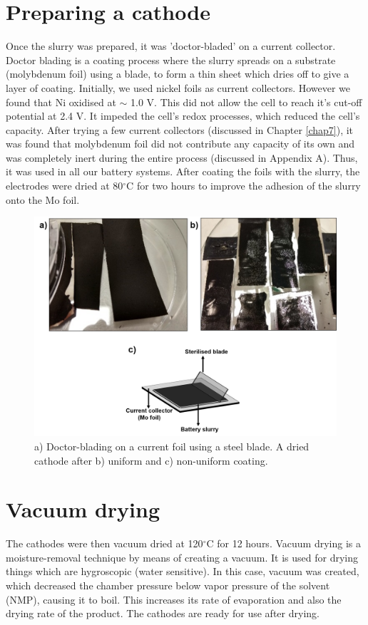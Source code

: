 \section{Preparing a cathode}
Once the slurry was prepared, it was 'doctor-bladed' on a current collector. Doctor blading is a coating process where the slurry spreads on a substrate (molybdenum foil)  using a blade, to form a thin sheet which dries off to give a layer of coating.  Initially, we used nickel foils as current collectors. However we found that Ni oxidised at $\sim$ 1.0 V. This did not allow the cell to reach it's cut-off potential at 2.4 V. It impeded the cell's redox processes, which reduced the cell's capacity. After trying a few current collectors (discussed in Chapter \ref{chap7}), it was found that molybdenum foil did not contribute any capacity of its own and was completely inert during the entire process (discussed in Appendix A). Thus, it was used in all our battery systems. After coating the foils with the slurry, the electrodes were dried at 80$^{\circ}$C for two hours to improve the adhesion of the slurry onto the Mo foil. 

\begin{figure}[tbh!]
\centering
\includegraphics[width=\textwidth]{Figures/chap3fig/coating}
\caption{a) Doctor-blading on a current foil using a steel blade. A dried cathode after b) uniform and c) non-uniform coating.}
\label{Figures/chap3fig:coating}
\end{figure}

\section{Vacuum drying}
The cathodes were then vacuum dried at 120$^{\circ}$C for 12 hours. Vacuum drying is a moisture-removal technique by means of creating a vacuum. It is used for drying things which are hygroscopic (water sensitive). In this case, vacuum was created, which decreased the chamber pressure below vapor pressure of the solvent (NMP), causing it to boil. This increases its rate of evaporation and also the drying rate of the product. The cathodes are ready for use after drying. 


